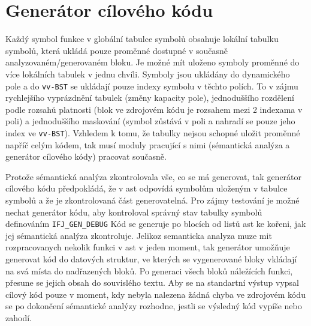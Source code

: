 \documentclass{article}
\begin{document}
\section{Generátor cílového kódu}

Každý symbol funkce v globální tabulce symbolů obsahuje lokální tabulku symbolů, která ukládá pouze proměnné dostupné v současně analyzovaném/generovaném bloku. Je možné mít uloženo symboly proměnné do více lokálních tabulek v jednu chvíli. Symboly jsou ukládány do dynamického pole a do \texttt{vv-BST} se ukládají pouze indexy symbolu v těchto polích. To v zájmu rychlejšího vyprázdnění tabulek (změny kapacity pole), jednoduššího rozdělení podle rozsahů platnosti (blok ve zdrojovém kódu je rozsahem mezi 2 indexama v poli) a jednoduššího maskování (symbol zůstává v poli a nahradí se pouze jeho index ve \texttt{vv-BST}). Vzhledem k tomu, že tabulky nejsou schopné uložit proměnné napříč celým kódem, tak musí moduly pracující s nimi (sémantická analýza a generátor cílového kódy) pracovat současně.

Protože sémantická analýza zkontrolovala vše, co se má generovat, tak generátor cílového kódu předpokládá, že v ast odpovídá symbolům uloženým v tabulce symbolů a že je zkontrolovaná část generovatelná.
Pro zájmy testování je možné nechat generátor kódu, aby kontroloval správný stav tabulky symbolů definováním \texttt{IFJ\_GEN\_DEBUG}
Kód se generuje po blocích od listů ast ke kořeni, jak jej sémantická analýza zkontroluje.
Jelikoz semanticka analyza muze mit rozpracovanych nekolik funkci v ast v jeden moment, tak generátor umožňuje generovat kód do datových struktur, ve kterých se vygenerované bloky vkládají na svá místa do nadřazených bloků.
Po generaci všech bloků náležících funkci, přesune se jejich obsah do souvislého textu.
Aby se na standartní výstup vypsal cílový kód pouze v moment, kdy nebyla nalezena žádná chyba ve zdrojovém kódu se po dokončení sémantické analýzy rozhodne, jestli se výsledný kód vypíše nebo zahodí.
\end{document}
